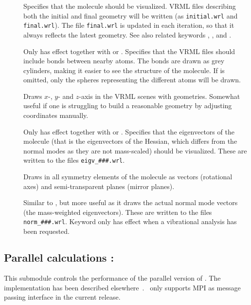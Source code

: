 \begin{description}
\item[]
Specifies that the molecule should be
visualized. VRML files describing
both the initial and final geometry
will be written (as \verb|initial.wrl| and \verb|final.wrl|). The file
\verb|final.wrl| is  updated in each iteration, so that it always
reflects the latest geometry. See also related keywords ,
,  and .

\item[]
Only has effect together with  or . Specifies
that the VRML files should include bonds between nearby
atoms. The
bonds are drawn as grey cylinders, making it easier to see the
structure of the molecule. If  is omitted, only the
spheres representing the different atoms will be drawn.

\item[]
Draws $x$-, $y$- and $z$-axis in the VRML scenes with
geometries. Somewhat useful if one is struggling to build a reasonable
geometry by adjusting coordinates manually.

\item[]
Only has effect together with  or
.
Specifies that the eigenvectors of the molecule (that is the
eigenvectors of the Hessian, which differs from the normal modes as
they are not mass-scaled) should be visualized. These are written to
the files \verb|eigv_###.wrl|.

\item[]
Draws in all symmetry elements of the molecule as vectors (rotational
axes) and semi-transparent planes (mirror planes).

\item[]
Similar to , but more useful as it draws the actual normal
mode vectors (the mass-weighted eigenvectors). These are written to
the files \verb|norm_###.wrl|. Keyword only has effect when a
vibrational analysis has been requested.

\end{description}


\subsection{Parallel calculations : }

This submodule controls the performance of the parallel
version
of \siraba . The implementation has been described
elsewhere~\cite{pndjhapdkrthhkcpl253}. \dalton\ only supports MPI as
message passing interface in the current release.

